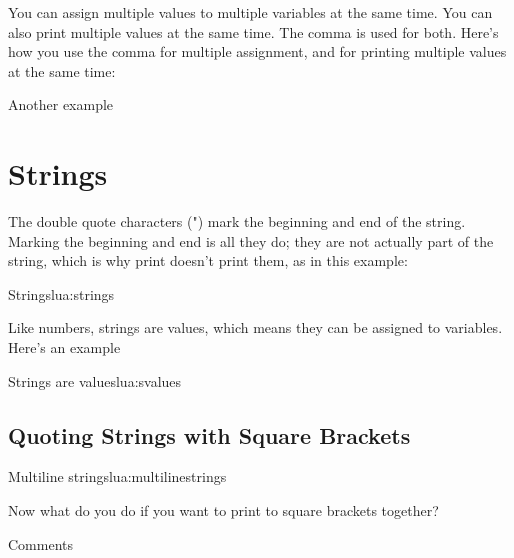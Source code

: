 You can assign multiple values to multiple variables at the same time. You can also print multiple values
at the same time. The comma is used for both. Here's how you use the comma for multiple assignment, and for printing multiple values at the same time:

\begin{texexample}{Another example}{}
\end{texexample}



\section{Strings}

The double quote characters (") mark the beginning and end of the string. Marking the beginning and
end is all they do; they are not actually part of the string, which is why print doesn't print them, as in
this example:

\begin{texexample}{Strings}{lua:strings}
\end{texexample}

Like numbers, strings are values, which means they can be assigned to variables. Here's an example

\begin{texexample}{Strings are values}{lua:svalues}
\end{texexample}

\subsection{Quoting Strings with Square Brackets}

\begin{texexample}{Multiline strings}{lua:multilinestrings}
\end{texexample}

Now what do you do if you want to print to square brackets together?

\begin{texexample}{Comments}{}
\ttfamily {}
\end{texexample}


